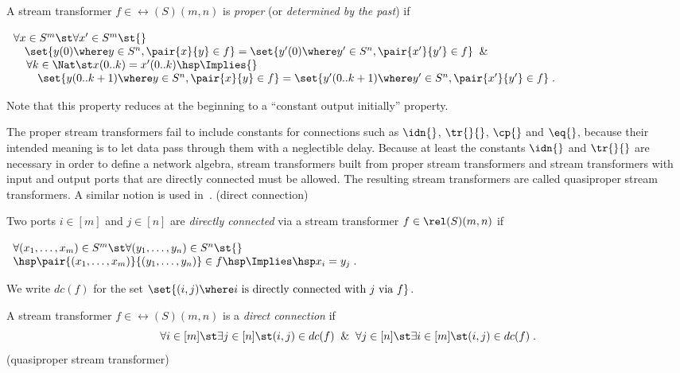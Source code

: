 \documentclass[fleqn]{llncs}
\begin{document}
\noindent
A stream transformer $f \in \rel(S)(m,n)$ is {\em proper\/}
(or {\em determined by the past\/}) if
\begin{center}
$
\begin{array}[t]{l}
\forall x  \in S^m  \st  \forall x' \in S^m  \st {} \\ \quad
  \set{y(0) \where y \in S^n, \pair{x}{y} \in f}
  = \set{  y'(0) \where y' \in S^n, \pair{x'}{y'} \in f} \And {} \\ \quad\,
 \forall k  \in \Nat \st x(0..k) = x'(0..k) \hsp \Implies {} \\ \qquad\,
  \set{y(0..k+1) \where y \in S^n, \pair{x}{y} \in f}
  = \set{  y'(0..k+1) \where y' \in S^n, \pair{x'}{y'} \in f}\;.
\end{array}
$
\end{center}
\edfn

Note that this property reduces at the beginning to a ``constant output
initially'' property.

The proper stream transformers fail to include constants for connections
such as $\idn{}$, $\tr{}{}$, $\cp{}$ and $\eq{}$, because their intended
meaning is to let data pass through them with a neglectible delay.
Because at least the constants $\idn{}$ and $\tr{}{}$ are necessary in
order to define a network algebra, stream transformers built from proper
stream transformers and stream transformers with input and output ports
that are directly connected must be allowed.
The resulting stream transformers are called quasiproper stream
transformers.
A similar notion is used in~\cite{BWM94}.
\bdfn (direct connection)
\label{dfn-direct}

\noindent
Two ports $i \in [m]$ and $j \in [n]$ are {\em directly connected\/}
via a stream transformer $f \in {\sf \rel }(S)(m,n)$ if
\begin{center}
$
\begin{array}[t]{l}
\forall (x_1,\dots,x_m) \in S^m \st
\forall (y_1,\dots,y_n) \in S^n \st {} \\ \hsp
 \pair{(x_1,\dots,x_m)}{(y_1,\dots,y_n)} \in f \hsp \Implies \hsp
 x_i = y_j\;.
\end{array}
$
\end{center}
We write $dc(f)$ for the set
$\set{(i,j) \where
      i \mbox{ is directly connected with } j \mbox{ via } f}$.

A stream transformer $f \in \rel(S)(m,n)$ is a {\em direct connection\/}
if
$$
\forall i \in [m] \st \exists j \in [n] \st (i,j) \in dc(f) \And
\forall j \in [n] \st \exists i \in [m] \st (i,j) \in dc(f)\;.
$$
\edfn
\bdfn (quasiproper stream transformer)
\label{dfn-quasiproper}
\end{document}
